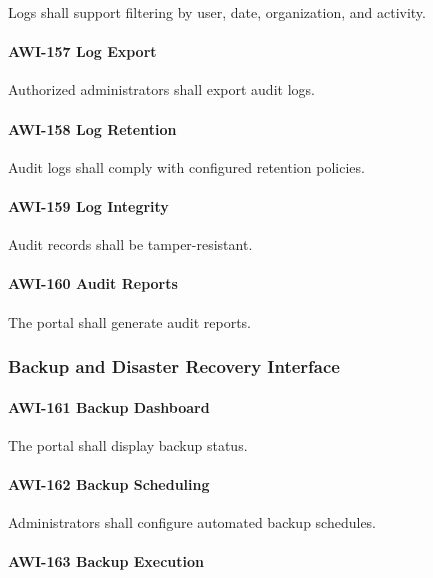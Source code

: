 Logs shall support filtering by user, date, organization, and activity.

\paragraph{AWI-157 Log Export}

Authorized administrators shall export audit logs.

\paragraph{AWI-158 Log Retention}

Audit logs shall comply with configured retention policies.

\paragraph{AWI-159 Log Integrity}

Audit records shall be tamper-resistant.

\paragraph{AWI-160 Audit Reports}

The portal shall generate audit reports.


\subsubsection*{Backup and Disaster Recovery Interface}

\paragraph{AWI-161 Backup Dashboard}

The portal shall display backup status.

\paragraph{AWI-162 Backup Scheduling}

Administrators shall configure automated backup schedules.

\paragraph{AWI-163 Backup Execution}

